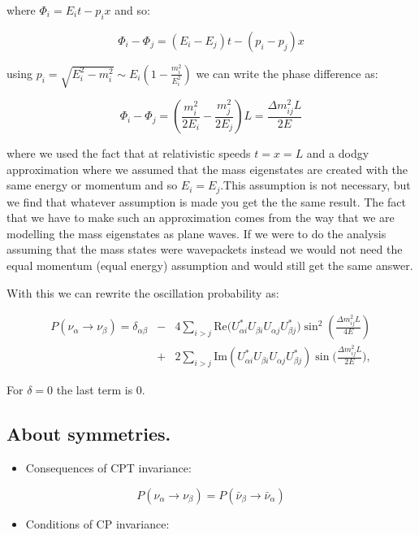 \documentclass[
  letterpaper,
  DIV=11,
  numbers=noendperiod]{scrreprt}
\providecommand{\tightlist}{%
  \setlength{\itemsep}{0pt}\setlength{\parskip}{0pt}}\usepackage{longtable,booktabs,array}
\begin{document}
where \(\Phi_i = E_i t- p_i x\) and so:

\[\Phi_i - \Phi_j = (E_i - E_j)t - (p_i -p_j)x\]

using \(p_i = \sqrt{E^2_i -m_i^2}\sim E_i(1-\frac{m^2_i}{E_i^2})\) we
can write the phase difference as:

\[\Phi_i - \Phi_j = (\frac{m_i^2}{2E_i}-\frac{m_j^2}{2E_j})L = \frac{\Delta m_{ij}^2L}{2E}\]

where we used the fact that at relativistic speeds \(t = x = L\) and a
dodgy approximation where we assumed that the mass eigenstates are
created with the same energy or momentum and so \(E_i = E_j\).This
assumption is not necessary, but we find that whatever assumption is
made you get the the same result. The fact that we have to make such an
approximation comes from the way that we are modelling the mass
eigenstates as plane waves. If we were to do the analysis assuming that
the mass states were wavepackets instead we would not need the equal
momentum (equal energy) assumption and would still get the same answer.

With this we can rewrite the oscillation probability as:

\[\begin{matrix}P(\nu_\alpha \rightarrow \nu_\beta)=\delta_{\alpha\beta} & - & 4{\displaystyle \sum_{i>j}\mathrm{ Re}(U_{\alpha i}^{*}U_{\beta i}U_{\alpha j}U_{\beta j}^{*}})\sin^{2}(\frac{\Delta m_{ij}^{2}L}{4E})\\ & + & {\displaystyle 2\sum_{i>j}\mathrm{ Im}(U_{\alpha i}^{*}U_{\beta i}U_{\alpha j}U_{\beta j}^{*})\sin(}\frac{\Delta m_{ij}^{2}L}{2E}),\end{matrix}\]

For \(\delta = 0\) the last term is 0.

\subsection{About symmetries.}\label{about-symmetries.}

\begin{itemize}
\tightlist
\item
  Consequences of CPT invariance:
\end{itemize}

\[P(\nu_\alpha \rightarrow \nu_\beta) = P({\bar \nu_\beta} \rightarrow {\bar \nu_\alpha})\]

\begin{itemize}
\tightlist
\item
  Conditions of CP invariance:
\end{itemize}
\end{document}
